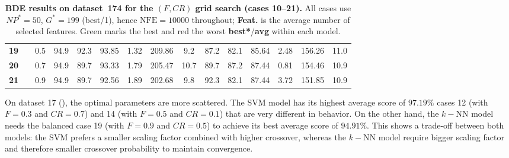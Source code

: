 \documentclass[12pt, openany]{article}
\begin{document}
\begin{table}[H]
{\begin{tabular}{|c c c | c c c c c c | c c c c c c |}
        \textbf{19} &  & 0.5 & \cellcolor{best}94.9 & 92.3 & \cellcolor{best}93.85 & 1.32 & 209.86 & 9.2 & \cellcolor{worst}87.2 & 82.1 & 85.64 & 2.48 & 156.26 & 11.0 \\
        \textbf{20} &  & 0.7 & \cellcolor{best}94.9 & 89.7 & 93.33 & 1.79 & 205.47 & 10.7 & 89.7 & 87.2 & \cellcolor{best}87.44 & 0.81 & 154.46 & 10.9 \\
        \textbf{21} &  & 0.9 & \cellcolor{best}94.9 & 89.7 & 92.56 & 1.89 & 202.68 & 9.8 & \cellcolor{best}92.3 & 82.1 & \cellcolor{best}87.44 & 3.72 & 151.85 & 10.9 \\
        \hline
    \end{tabular}
    }
    \caption{\textbf{BDE results on dataset~174 for the $(F, CR)$ grid search (cases 10--21).} All cases use $NP^{*}{=}50$, $G^{*}{=}199$ (best/1), hence $\mathrm{NFE}=10000$ throughout; \textbf{Feat.} is the average number of selected features. Green marks the best and red the worst \textbf{best*}/\textbf{avg} within each model.}
    \label{tab:results_BDE_FCR_d174}
\end{table}

On dataset 17 (), the optimal parameters are more scattered. The SVM model has its highest average score of $97.19\%$ cases 12 (with $F=0.3$ and $CR=0.7$) and 14 (with $F=0.5$ and $CR=0.1$) that are very different in behavior. On the other hand, the $k-$NN model needs the balanced case 19 (with $F=0.9$ and $CR=0.5$) to achieve its best average score of $94.91\%$. This shows a trade-off between both models: the SVM prefers a smaller scaling factor combined with higher crossover, whereas the $k-$NN model require bigger scaling factor and therefore smaller crossover probability to maintain convergence.
\end{document}
